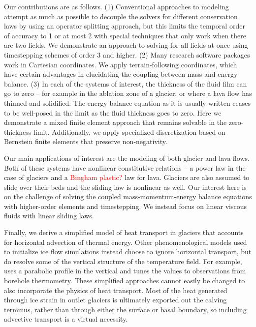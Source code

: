 \documentclass{article}
\theoremstyle{definition}
\theoremstyle{plain}
\begin{document}
Our contributions are as follows.
(1) Conventional approaches to modeling attempt as much as possible to decouple the solvers for different conservation laws by using an operator splitting approach, but this limits the temporal order of accuracy to 1 or at most 2 with special techniques that only work when there are two fields.
We demonstrate an approach to solving for all fields at once using timestepping schemes of order 3 and higher.
(2) Many research software packages work in Cartesian coordinates.
We apply terrain-following coordinates, which have certain advantages in elucidating the coupling between mass and energy balance.
(3) In each of the systems of interest, the thickness of the fluid film can go to zero -- for example in the ablation zone of a glacier, or where a lava flow has thinned and solidified.
The energy balance equation as it is usually written ceases to be well-posed in the limit as the fluid thickness goes to zero.
Here we demonstrate a mixed finite element approach that remains solvable in the zero-thickness limit.
Additionally, we apply specialized discretization based on Bernstein finite elements that preserve non-negativity.

Our main applications of interest are the modeling of both glacier and lava flows.
Both of these systems have nonlinear constitutive relations -- a power law in the case of glaciers and a \textcolor{red}{Bingham plastic?} law for lava.
Glaciers are also assumed to slide over their beds and the sliding law is nonlinear as well.
Our interest here is on the challenge of solving the coupled mass-momentum-energy balance equations with higher-order elements and timestepping.
We instead focus on linear viscous fluids with linear sliding laws.

Finally, we derive a simplified model of heat transport in glaciers that accounts for horizontal advection of thermal energy.
Other phenomenological models used to initialize ice flow simulations instead choose to ignore horizontal transport, but do resolve some of the vertical structure of the temperature field.
For example, \citet{humbert2005parameter} uses a parabolic profile in the vertical and tunes the values to observations from borehole thermometry.
These simplified approaches cannot easily be changed to also incorporate the physics of heat transport.
Most of the heat generated through ice strain in outlet glaciers is ultimately exported out the calving terminus, rather than through either the surface or basal boundary, so including advective transport is a virtual necessity.
\end{document}
